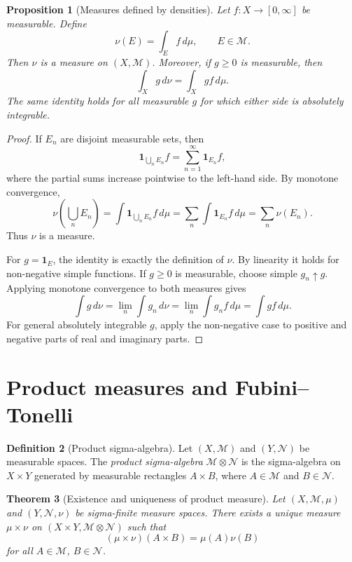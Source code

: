 \documentclass[11pt,openany]{book}
\numberwithin{equation}{chapter}
\theoremstyle{definition}
\newtheorem{definition}{Definition}[chapter]
\theoremstyle{plain}
\newtheorem{theorem}[definition]{Theorem}
\newtheorem{proposition}[definition]{Proposition}
\theoremstyle{remark}
\newcommand{\M}{\mathcal{M}}
\newcommand{\1}{\mathbf{1}}
\newcommand{\dd}{\,d}
\begin{document}
\begin{proposition}[Measures defined by densities]
Let \(f:X\to[0,\infty]\) be measurable. Define
\[
  \nu(E)=\int_E f\dd\mu,\qquad E\in\M.
\]
Then \(\nu\) is a measure on \((X,\M)\). Moreover, if \(g\geq0\) is measurable, then
\[
  \int_X g\dd\nu=\int_X gf\dd\mu.
\]
The same identity holds for all measurable \(g\) for which either side is absolutely integrable.
\end{proposition}

\begin{proof}
If \(E_n\) are disjoint measurable sets, then
\[
  \1_{\bigcup_nE_n}f=\sum_{n=1}^{\infty}\1_{E_n}f,
\]
where the partial sums increase pointwise to the left-hand side. By monotone convergence,
\[
  \nu\left(\bigcup_nE_n\right)=\int \1_{\bigcup_nE_n}f\dd\mu
  =\sum_n\int \1_{E_n}f\dd\mu
  =\sum_n\nu(E_n).
\]
Thus \(\nu\) is a measure.

For \(g=\1_E\), the identity is exactly the definition of \(\nu\). By linearity it holds for non-negative simple functions. If \(g\geq0\) is measurable, choose simple \(g_n\uparrow g\). Applying monotone convergence to both measures gives
\[
  \int g\dd\nu=\lim_n\int g_n\dd\nu
  =\lim_n\int g_nf\dd\mu
  =\int gf\dd\mu.
\]
For general absolutely integrable \(g\), apply the non-negative case to positive and negative parts of real and imaginary parts.
\end{proof}

\section{Product measures and Fubini--Tonelli}\label{sec:abstract-product-measures}

\begin{definition}[Product sigma-algebra]
Let \((X,
\M)\) and \((Y,\mathcal N)\) be measurable spaces. The \emph{product sigma-algebra} \(\M\otimes\mathcal N\) is the sigma-algebra on \(X\times Y\) generated by measurable rectangles \(A\times B\), where \(A\in\M\) and \(B\in\mathcal N\).
\end{definition}

\begin{theorem}[Existence and uniqueness of product measure]
Let \((X,\M,\mu)\) and \((Y,\mathcal N,\nu)\) be sigma-finite measure spaces. There exists a unique measure \(\mu\times\nu\) on \((X\times Y,\M\otimes\mathcal N)\) such that
\[
  (\mu\times\nu)(A\times B)=\mu(A)\nu(B)
\]
for all \(A\in\M\), \(B\in\mathcal N\).
\end{theorem}
\end{document}

